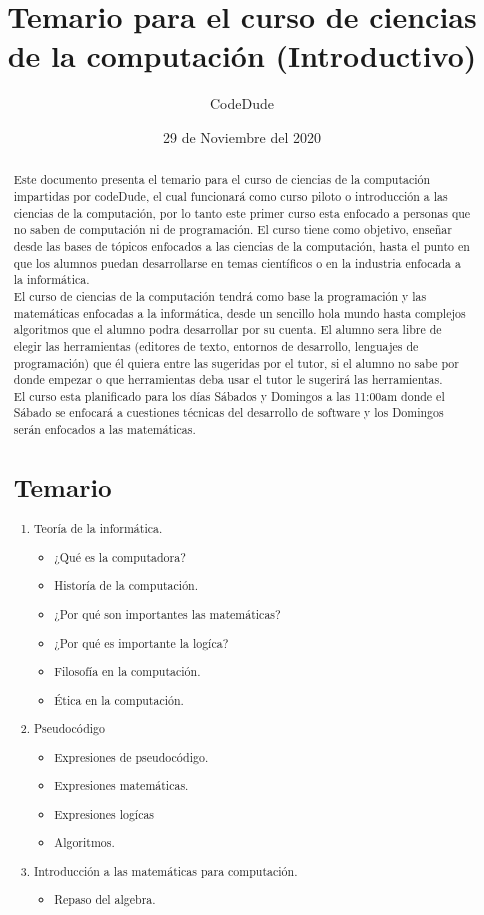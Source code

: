 \documentclass[12pt, letterpaper]{article}
\author{CodeDude}
\title{Temario para el curso de ciencias de la computación (Introductivo)}
\date{29 de Noviembre del 2020}
\begin{document}
\maketitle
\newpage
\begin{abstract}
Este documento presenta el temario para el curso de ciencias de la computación impartidas por codeDude, el cual funcionará como curso piloto o introducción
a las ciencias de la computación, por lo tanto este primer curso esta enfocado a personas que no saben de computación ni de  programación.
El curso tiene como objetivo, enseñar desde las bases de tópicos enfocados a las ciencias de la computación, hasta el punto en 
que los alumnos puedan desarrollarse en temas científicos
o en la industria enfocada a la informática.\\
El curso de ciencias de la computación tendrá como base la programación y las matemáticas enfocadas a la informática, desde un sencillo hola mundo
hasta complejos algoritmos que el alumno podra desarrollar por su cuenta. El alumno sera libre de elegir las herramientas (editores de texto, entornos de
desarrollo, lenguajes de programación) que él quiera entre las sugeridas por el tutor, si el alumno no sabe por donde empezar o que herramientas deba usar
el tutor le sugerirá las herramientas.\\
El curso esta planificado para los días Sábados y Domingos a las 11:00am donde el Sábado se enfocará a cuestiones técnicas del desarrollo de software y los
Domingos serán enfocados a las matemáticas.
\newpage
\section{Temario}
\begin{enumerate}
  \item Teoría de la informática.
    \begin{itemize}
      \item ¿Qué es la computadora?	
      \item Historía de la computación.
      \item ¿Por qué son importantes las matemáticas?
      \item ¿Por qué es importante la logíca?
      \item Filosofía en la computación.
      \item Ética en la computación.
    \end{itemize} 
  \item Pseudocódigo
    \begin{itemize}
      \item Expresiones de pseudocódigo.
      \item Expresiones matemáticas.
      \item Expresiones logícas
      \item Algoritmos.
    \end{itemize}
  \item Introducción a las matemáticas para computación.
    \begin{itemize}
      \item Repaso del algebra.	
    \end{itemize}
\end{enumerate}
\end{abstract}
\end{document}

